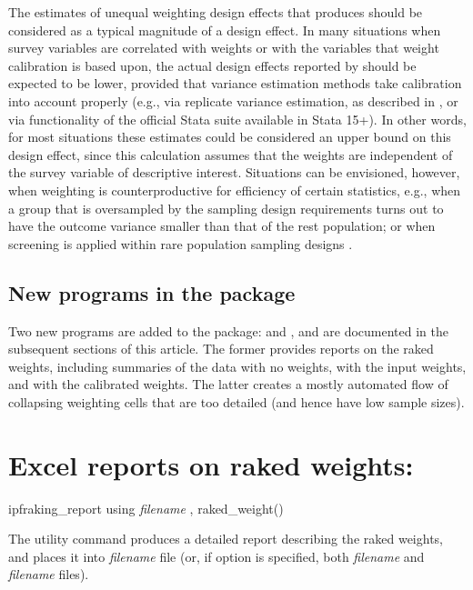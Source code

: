 The estimates of unequal weighting design effects that  produces
should be considered as a typical magnitude of a design effect. 
In many situations when survey variables are correlated with weights
or with the variables that weight calibration is based upon, the actual
design effects reported by  should be expected
to be lower, provided that variance estimation methods take calibration
into account properly (e.g., via replicate variance estimation, as described
in \citet{kolenikov:2010}, or via  functionality
of the official Stata  suite available in Stata 15+).
In other words, for most situations these estimates could be considered an upper bound 
on this design effect, since this calculation assumes that the weights are independent of 
the survey variable of descriptive interest. Situations can be envisioned, however,
when weighting is counterproductive for efficiency of certain statistics,
e.g., when a group that is oversampled by the sampling design requirements
turns out to have the outcome variance smaller than that of the rest population;
or when screening is applied within rare population sampling designs
\citep{anderson:kalton:1984;kalton:h2r:2016}.


\subsection{New programs in the package}

Two new programs are added to the package:  and ,
and are documented in the subsequent sections of this article. The former provides reports on the raked weights,
including summaries of the data with no weights, with the input weights, and with the calibrated weights.
The latter creates a mostly automated flow of collapsing weighting cells that are too detailed
(and hence have low sample sizes).

\section{Excel reports on raked weights:  }

\begin{stsyntax}
ipfraking\_report
using \textit{filename}
,
raked\_weight(\varname)
\end{stsyntax}

The utility command  produces a detailed report
describing the raked weights, and places it into \textit{filename} file
(or, if  option is specified, both \textit{filename} and \textit{filename}
files).

